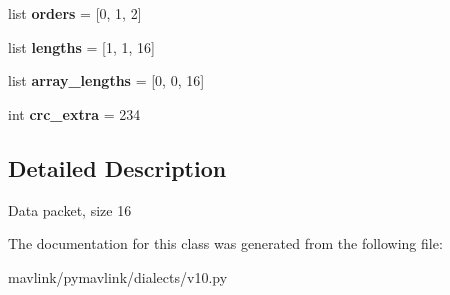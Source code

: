 \begin{DoxyCompactItemize}
\mbox{\label{classpymavlink_1_1dialects_1_1v10_1_1MAVLink__data16__message_ad826c0ac6fc7f01914830ec733b2125d}} 
list {\bfseries orders} = \mbox{[}0, 1, 2\mbox{]}
\item 
\mbox{\label{classpymavlink_1_1dialects_1_1v10_1_1MAVLink__data16__message_af2cb2d2fe11a81b6b0ccde58e29237d0}} 
list {\bfseries lengths} = \mbox{[}1, 1, 16\mbox{]}
\item 
\mbox{\label{classpymavlink_1_1dialects_1_1v10_1_1MAVLink__data16__message_a3e7a1d9d83195918b2d602d4eb014d34}} 
list {\bfseries array\+\_\+lengths} = \mbox{[}0, 0, 16\mbox{]}
\item 
\mbox{\label{classpymavlink_1_1dialects_1_1v10_1_1MAVLink__data16__message_a4595d6079eb64bb236ec76558ffe5911}} 
int {\bfseries crc\+\_\+extra} = 234
\end{DoxyCompactItemize}


\subsection{Detailed Description}
\begin{DoxyVerb}Data packet, size 16
\end{DoxyVerb}
 

The documentation for this class was generated from the following file\+:\begin{DoxyCompactItemize}
\item 
mavlink/pymavlink/dialects/v10.\+py\end{DoxyCompactItemize}
